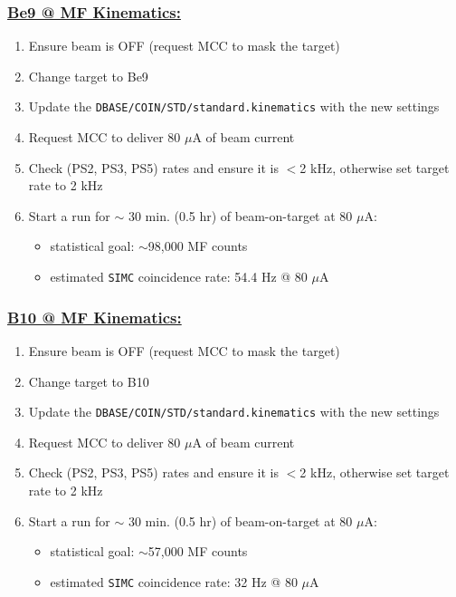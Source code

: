 \documentclass{article}
\begin{document}
\subsubsection*{\underline{Be9 @ MF Kinematics:}}
\begin{enumerate}
\item Ensure beam is OFF (request MCC to mask the target)
\item Change target to Be9
\item Update the \texttt{DBASE/COIN/STD/standard.kinematics} with the new settings
\item Request MCC to deliver 80 $\mu$A of beam current
\item Check (PS2, PS3, PS5) rates and ensure it is $<$2 kHz, otherwise set target rate to 2 kHz
\item Start a run for $\sim$ 30 min. (0.5 hr) of beam-on-target at 80 $\mu$A:
\begin{itemize}
    \item statistical goal: $\sim$98,000 MF counts
    \item estimated \texttt{SIMC} coincidence rate: 54.4 Hz @ 80 $\mu$A
\end{itemize}
\end{enumerate}

\subsubsection*{\underline{B10 @ MF Kinematics:}}
\begin{enumerate}
\item Ensure beam is OFF (request MCC to mask the target)
\item Change target to B10
\item Update the \texttt{DBASE/COIN/STD/standard.kinematics} with the new settings
\item Request MCC to deliver 80 $\mu$A of beam current
\item Check (PS2, PS3, PS5) rates and ensure it is $<$2 kHz, otherwise set target rate to 2 kHz
\item Start a run for $\sim$ 30 min. (0.5 hr) of beam-on-target at 80 $\mu$A:
\begin{itemize}
    \item statistical goal: $\sim$57,000 MF counts
    \item estimated \texttt{SIMC} coincidence rate: 32 Hz @ 80 $\mu$A
\end{itemize}
\end{enumerate}
\end{document}
